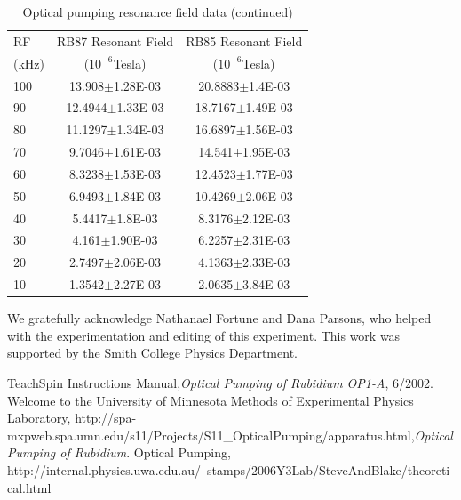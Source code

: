 \documentclass[prb,preprint]{revtex4-1}
\begin{document}
\begin{table}[h]
\centering
\caption{Optical pumping resonance field data (continued)}
\begin{ruledtabular}
\begin{tabular}{ l c c}
RF & RB87 Resonant Field & RB85 Resonant Field\\
(kHz) & ($10^{-6}$Tesla) & ($10^{-6}$Tesla)\\
\hline
100 & 13.908$\pm$1.28E-03 & 20.8883$\pm$1.4E-03\\
90 & 12.4944$\pm$1.33E-03 & 18.7167$\pm$1.49E-03\\
80 & 11.1297$\pm$1.34E-03 & 16.6897$\pm$1.56E-03\\
70 & 9.7046$\pm$1.61E-03 & 14.541$\pm$1.95E-03\\
60 & 8.3238$\pm$1.53E-03 & 12.4523$\pm$1.77E-03\\
50 & 6.9493$\pm$1.84E-03 & 10.4269$\pm$2.06E-03\\
40 & 5.4417$\pm$1.8E-03 & 8.3176$\pm$2.12E-03\\
30 & 4.161$\pm$1.90E-03 & 6.2257$\pm$2.31E-03\\
20 &	2.7497$\pm$2.06E-03 & 4.1363$\pm$2.33E-03\\
10 &	1.3542$\pm$2.27E-03 & 2.0635$\pm$3.84E-03\\
\end{tabular}
\end{ruledtabular}
\label{data2}
\end{table}


\clearpage

\begin{acknowledgments}

We gratefully acknowledge Nathanael Fortune and Dana Parsons, who helped with the experimentation and editing of this experiment.  This work was supported by the Smith College Physics Department.

\end{acknowledgments}


\begin{thebibliography}{99}

 TeachSpin Instructions Manual,\textit{Optical Pumping of Rubidium OP1-A}, 6/2002.
 Welcome to the University of Minnesota Methods of Experimental Physics Laboratory, http://spa-mxpweb.spa.umn.edu/s11/Projects/S11\_OpticalPumping/apparatus.html,\textit{Optical Pumping of Rubidium}.
 Optical Pumping, http://internal.physics.uwa.edu.au/~stamps/2006Y3Lab/SteveAndBlake/theoretical.html

\end{thebibliography}

\end{document}

